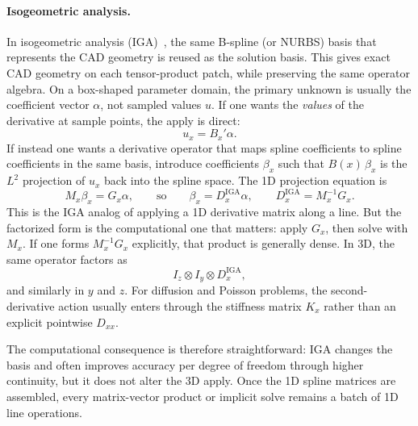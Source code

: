 \documentclass[11pt]{article}
\newcommand{\kron}{\otimes}
\newcommand{\Dxx}{D_{xx}}
\begin{document}
\paragraph{Isogeometric analysis.}
In isogeometric analysis
(IGA)~\citep{hughes2005isogeometric,cottrell2009isogeometric}, the
same B-spline (or NURBS) basis that represents the CAD geometry is
reused as the solution basis.  This gives exact CAD geometry on each
tensor-product patch, while preserving the same operator algebra.  On
a box-shaped parameter domain, the primary unknown is usually the
coefficient vector $\alpha$, not sampled values $u$.  If one wants the
\emph{values} of the derivative at sample points, the apply is direct:
\[
  u_x = B_x' \alpha.
\]
If instead one wants a derivative operator that maps spline
coefficients to spline coefficients in the same basis, introduce
coefficients $\beta_x$ such that $B(x)\,\beta_x$ is the $L^2$
projection of $u_x$ back into the spline space.  The 1D projection
equation is
\begin{equation}
  M_x \beta_x = G_x \alpha,
  \qquad\text{so}\qquad
  \beta_x = D_x^{\mathrm{IGA}} \alpha,
  \qquad
  D_x^{\mathrm{IGA}} = M_x^{-1} G_x.
\end{equation}
This is the IGA analog of applying a 1D derivative matrix along a
line.  But the factorized form is the computational one that matters:
apply $G_x$, then solve with $M_x$.  If one forms $M_x^{-1}G_x$
explicitly, that product is generally dense.  In 3D, the same
operator factors as
\[
  I_z \kron I_y \kron D_x^{\mathrm{IGA}},
\]
and similarly in $y$ and $z$.  For diffusion and Poisson problems, the
second-derivative action usually enters through the stiffness matrix
$K_x$ rather than an explicit pointwise $\Dxx$.

The computational consequence is therefore straightforward: IGA changes
the basis and often improves accuracy per degree of freedom through
higher continuity, but it does not alter the 3D apply.  Once the 1D
spline matrices are assembled, every matrix-vector product or implicit
solve remains a batch of 1D line operations.
\end{document}
